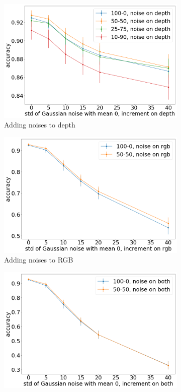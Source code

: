 \begin{figure}[h!]
	\centering
	\begin{subfigure}{0.32\textwidth}
		\centering
		\includegraphics[width=\textwidth]{img/noise_injection_depth}
		\caption{Adding noises to depth}
	\end{subfigure}
	\begin{subfigure}{0.32\textwidth}
		\centering
		\includegraphics[width=\textwidth]{img/noise_injection_rgb}
		\caption{Adding noises to RGB}
	\end{subfigure}
	\begin{subfigure}{0.32\textwidth}
		\centering
		\includegraphics[width=\textwidth]{img/noise_injection_both}

\end{subfigure}
\end{figure}
